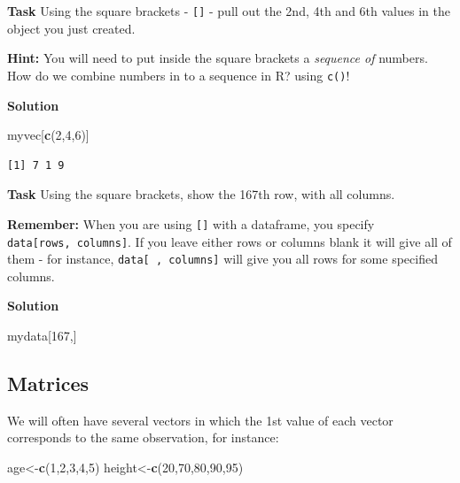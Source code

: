 \documentclass[]{book}
\newenvironment{Shaded}{\begin{snugshade}}{\end{snugshade}}
\newcommand{\DecValTok}[1]{\textcolor[rgb]{0.00,0.00,0.81}{#1}}
\newcommand{\KeywordTok}[1]{\textcolor[rgb]{0.13,0.29,0.53}{\textbf{#1}}}
\newcommand{\NormalTok}[1]{#1}
\begin{document}
\textbf{Task}
Using the square brackets - \texttt{{[}{]}} - pull out the 2nd, 4th and 6th values in the object you just created.

\textbf{Hint:} You will need to put inside the square brackets a \emph{sequence of} numbers. How do we combine numbers in to a sequence in R? using \texttt{c()}!

\textbf{Solution }

\begin{Shaded}
\begin{Highlighting}[]
\NormalTok{myvec[}\KeywordTok{c}\NormalTok{(}\DecValTok{2}\NormalTok{,}\DecValTok{4}\NormalTok{,}\DecValTok{6}\NormalTok{)]}
\end{Highlighting}
\end{Shaded}

\begin{verbatim}
[1] 7 1 9
\end{verbatim}

\textbf{Task}
Using the square brackets, show the 167th row, with all columns.

\textbf{Remember:} When you are using \texttt{{[}{]}} with a dataframe, you specify \texttt{data{[}rows,\ columns{]}}. If you leave either rows or columns blank it will give all of them - for instance, \texttt{data{[}\ ,\ columns{]}} will give you all rows for some specified columns.

\textbf{Solution }

\begin{Shaded}
\begin{Highlighting}[]
\NormalTok{mydata[}\DecValTok{167}\NormalTok{,]}
\end{Highlighting}
\end{Shaded}

\hypertarget{matrices}{%
\subsection*{Matrices}\label{matrices}}

We will often have several vectors in which the 1st value of each vector corresponds to the same observation, for instance:

\begin{Shaded}
\begin{Highlighting}[]
\NormalTok{age<-}\KeywordTok{c}\NormalTok{(}\DecValTok{1}\NormalTok{,}\DecValTok{2}\NormalTok{,}\DecValTok{3}\NormalTok{,}\DecValTok{4}\NormalTok{,}\DecValTok{5}\NormalTok{)}
\NormalTok{height<-}\KeywordTok{c}\NormalTok{(}\DecValTok{20}\NormalTok{,}\DecValTok{70}\NormalTok{,}\DecValTok{80}\NormalTok{,}\DecValTok{90}\NormalTok{,}\DecValTok{95}\NormalTok{)}
\end{Highlighting}
\end{Shaded}
\end{document}
